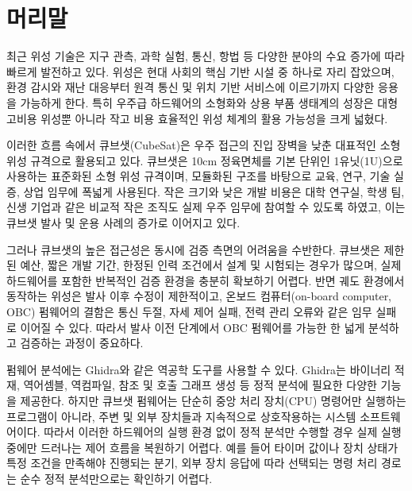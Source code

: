 \documentclass[master,korean,final]{kaist-ucs}
\begin{document}
    \addtocounter{pagemarker}{1}
    \newpage  

    \tableofcontents

    \listoftables

    \listoffigures

\chapter{머리말}

최근 위성 기술은 지구 관측, 과학 실험, 통신, 항법 등 다양한 분야의 수요 증가에 따라 빠르게 발전하고 있다. 위성은 현대 사회의 핵심 기반 시설 중 하나로 자리 잡았으며, 환경 감시와 재난 대응부터 원격 통신 및 위치 기반 서비스에 이르기까지 다양한 응용을 가능하게 한다. 특히 우주급 하드웨어의 소형화와 상용 부품 생태계의 성장은 대형 고비용 위성뿐 아니라 작고 비용 효율적인 위성 체계의 활용 가능성을 크게 넓혔다.

이러한 흐름 속에서 큐브샛(CubeSat)은 우주 접근의 진입 장벽을 낮춘 대표적인 소형 위성 규격으로 활용되고 있다. 큐브샛은 10cm 정육면체를 기본 단위인 1유닛(1U)으로 사용하는 표준화된 소형 위성 규격이며\cite{CDS}, 모듈화된 구조를 바탕으로 교육, 연구, 기술 실증, 상업 임무에 폭넓게 사용된다. 작은 크기와 낮은 개발 비용은 대학 연구실, 학생 팀, 신생 기업과 같은 비교적 작은 조직도 실제 우주 임무에 참여할 수 있도록 하였고, 이는 큐브샛 발사 및 운용 사례의 증가로 이어지고 있다.

그러나 큐브샛의 높은 접근성은 동시에 검증 측면의 어려움을 수반한다. 큐브샛은 제한된 예산, 짧은 개발 기간, 한정된 인력 조건에서 설계 및 시험되는 경우가 많으며, 실제 하드웨어를 포함한 반복적인 검증 환경을 충분히 확보하기 어렵다. 반면 궤도 환경에서 동작하는 위성은 발사 이후 수정이 제한적이고, 온보드 컴퓨터(on-board computer, OBC) 펌웨어의 결함은 통신 두절, 자세 제어 실패, 전력 관리 오류와 같은 임무 실패로 이어질 수 있다. 따라서 발사 이전 단계에서 OBC 펌웨어를 가능한 한 넓게 분석하고 검증하는 과정이 중요하다.

펌웨어 분석에는 Ghidra\cite{Ghidra}와 같은 역공학 도구를 사용할 수 있다. Ghidra는 바이너리 적재, 역어셈블, 역컴파일, 참조 및 호출 그래프 생성 등 정적 분석에 필요한 다양한 기능을 제공한다. 하지만 큐브샛 펌웨어는 단순히 중앙 처리 장치(CPU) 명령어만 실행하는 프로그램이 아니라, 주변 및 외부 장치들과 지속적으로 상호작용하는 시스템 소프트웨어이다. 따라서 이러한 하드웨어의 실행 환경 없이 정적 분석만 수행할 경우 실제 실행 중에만 드러나는 제어 흐름을 복원하기 어렵다. 예를 들어 타이머 값이나 장치 상태가 특정 조건을 만족해야 진행되는 분기, 외부 장치 응답에 따라 선택되는 명령 처리 경로는 순수 정적 분석만으로는 확인하기 어렵다.
\end{document}
